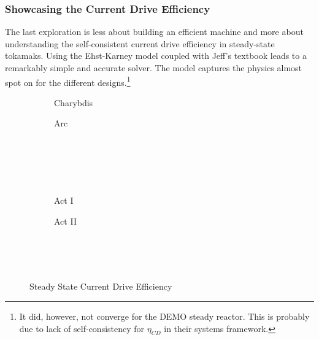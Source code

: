 \subsubsection{Showcasing the Current Drive Efficiency}

The last exploration is less about building an efficient machine and more about understanding the self-consistent current drive efficiency in steady-state tokamaks. Using the Ehst-Karney model coupled with Jeff's textbook leads to a remarkably simple and accurate solver. The model captures the physics almost spot on for the different designs.\footnote{ It did, however, not converge for the DEMO steady reactor. This is probably due to lack of self-consistency for $\eta_{CD}$ in their systems framework. }

\begin{figure*}
    \centering
    \hfill 
    \begin{subfigure}[t]{0.45\textwidth}
        \centering
		\begin{adjustbox}{width=\textwidth}
			\Large
			
		\end{adjustbox}
        \caption{Charybdis}
    \end{subfigure}
    \hfill
    \begin{subfigure}[t]{0.45\textwidth}
        \centering
		\begin{adjustbox}{width=\textwidth}
			\Large
			
		\end{adjustbox}
        \caption{Arc}
    \end{subfigure}
    \hfill \hfill ~\\ ~\\ ~\\ ~\\
    \hfill 
    \begin{subfigure}[t]{0.45\textwidth}
        \centering
		\begin{adjustbox}{width=\textwidth}
			\Large
			
		\end{adjustbox}
        \caption{Act I}
    \end{subfigure}
    \hfill
    \begin{subfigure}[t]{0.45\textwidth}
        \centering
		\begin{adjustbox}{width=\textwidth}
			\Large
			
		\end{adjustbox}
        \caption{Act II}
    \end{subfigure}
    \hfill \hfill ~\\ ~\\ ~\\
    \caption{Steady State Current Drive Efficiency}
    \label{fig:steady_eta_CD}
\end{figure*}

